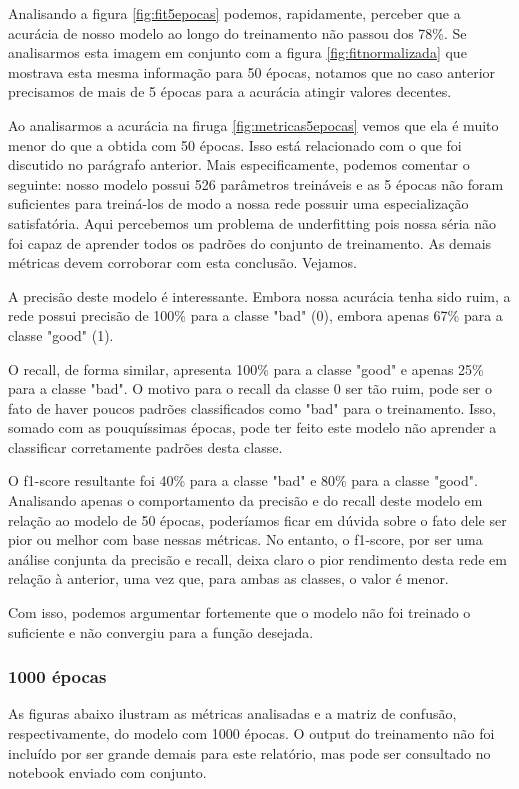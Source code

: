 \documentclass[12pt]{article}
\begin{document}
Analisando a figura \ref{fig:fit5epocas} podemos, rapidamente, perceber que a acurácia de nosso modelo ao longo do treinamento não passou dos 78\%. Se analisarmos esta imagem em conjunto com a figura \ref{fig:fitnormalizada} que mostrava esta mesma informação para 50 épocas, notamos que no caso anterior precisamos de mais de 5 épocas para a acurácia atingir valores decentes. 

Ao analisarmos a acurácia na firuga \ref{fig:metricas5epocas} vemos que ela é muito menor do que a obtida com 50 épocas. Isso está relacionado com o que foi discutido no parágrafo anterior. Mais especificamente, podemos comentar o seguinte: nosso modelo possui 526 parâmetros treináveis e as 5 épocas não foram suficientes para treiná-los de modo a nossa rede possuir uma especialização satisfatória. Aqui percebemos um problema de underfitting pois nossa séria não foi capaz de aprender todos os padrões do conjunto de treinamento. As demais métricas devem corroborar com esta conclusão. Vejamos.

A precisão deste modelo é interessante. Embora nossa acurácia tenha sido ruim, a rede possui precisão de 100\% para a classe "bad" (0), embora apenas 67\% para a classe "good" (1).

O recall, de forma similar, apresenta 100\% para a classe "good" e apenas 25\% para a classe "bad". O motivo para o recall da classe 0 ser tão ruim, pode ser o fato de haver poucos padrões classificados como "bad" para o treinamento. Isso, somado com as pouquíssimas épocas, pode ter feito este modelo não aprender a classificar corretamente padrões desta classe.

O f1-score resultante foi 40\% para a classe "bad" e 80\% para a classe "good". Analisando apenas o comportamento da precisão e do recall deste modelo em relação ao modelo de 50 épocas, poderíamos ficar em dúvida sobre o fato dele ser pior ou melhor com base nessas métricas. No entanto, o f1-score, por ser uma análise conjunta da precisão e recall, deixa claro o pior rendimento desta rede em relação à anterior, uma vez que, para ambas as classes, o valor é menor.

Com isso, podemos argumentar fortemente que o modelo não foi treinado o suficiente e não convergiu para a função desejada.


\subsubsection{1000 épocas}

As figuras abaixo ilustram as métricas analisadas e a matriz de confusão, respectivamente, do modelo com 1000 épocas. O output do treinamento não foi incluído por ser grande demais para este relatório, mas pode ser consultado no notebook enviado com conjunto.
\end{document}
